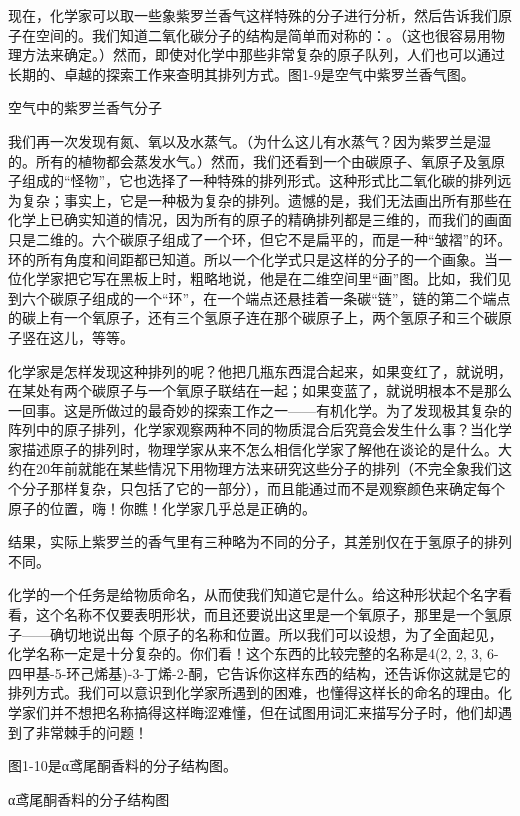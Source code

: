\documentclass[11pt,oneside]{book}
\begin{document}
\begin{common-format}
现在，化学家可以取一些象紫罗兰香气这样特殊的分子进行分析，然后告诉我们原子在空间的。我们知道二氧化碳分子的结构是简单而对称的：。（这也很容易用物理方法来确定。）然而，即使对化学中那些非常复杂的原子队列，人们也可以通过长期的、卓越的探索工作来查明其排列方式。图1-9是空气中紫罗兰香气图。
\begin{fig}{空气中的紫罗兰香气分子}
\label{fig:空气中的紫罗兰香气分子}
\end{fig}
我们再一次发现有氮、氧以及水蒸气。（为什么这儿有水蒸气？因为紫罗兰是湿的。所有的植物都会蒸发水气。）然而，我们还看到一个由碳原子、氧原子及氢原子组成的“怪物”，它也选择了一种特殊的排列形式。这种形式比二氧化碳的排列远为复杂；事实上，它是一种极为复杂的排列。遗憾的是，我们无法画出所有那些在化学上已确实知道的情况，因为所有的原子的精确排列都是三维的，而我们的画面只是二维的。六个碳原子组成了一个环，但它不是扁平的，而是一种“皱褶”的环。环的所有角度和间距都已知道。所以一个化学式只是这样的分子的一个画象。当一位化学家把它写在黑板上时，粗略地说，他是在二维空间里“画”图。比如，我们见到六个碳原子组成的一个“环”，在一个端点还悬挂着一条碳“链”，链的第二个端点的碳上有一个氧原子，还有三个氢原子连在那个碳原子上，两个氢原子和三个碳原子竖在这儿，等等。

化学家是怎样发现这种排列的呢？他把几瓶东西混合起来，如果变红了，就说明，在某处有两个碳原子与一个氧原子联结在一起；如果变蓝了，就说明根本不是那么一回事。这是所做过的最奇妙的探索工作之一——有机化学。为了发现极其复杂的阵列中的原子排列，化学家观察两种不同的物质混合后究竟会发生什么事？当化学家描述原子的排列时，物理学家从来不怎么相信化学家了解他在谈论的是什么。大约在20年前就能在某些情况下用物理方法来研究这些分子的排列（不完全象我们这个分子那样复杂，只包括了它的一部分），而且能通过而不是观察颜色来确定每个原子的位置，嗨！你瞧！化学家几乎总是正确的。

结果，实际上紫罗兰的香气里有三种略为不同的分子，其差别仅在于氢原子的排列不同。

化学的一个任务是给物质命名，从而使我们知道它是什么。给这种形状起个名字看看，这个名称不仅要表明形状，而且还要说出这里是一个氧原子，那里是一个氢原子——确切地说出每 个原子的名称和位置。所以我们可以设想，为了全面起见，化学名称一定是十分复杂的。你们看！这个东西的比较完整的名称是4(2, 2, 3, 6-四甲基-5-环己烯基)-3-丁烯-2-酮，它告诉你这样东西的结构，还告诉你这就是它的排列方式。我们可以意识到化学家所遇到的困难，也懂得这样长的命名的理由。化学家们并不想把名称搞得这样晦涩难懂，但在试图用词汇来描写分子时，他们却遇到了非常棘手的问题！

图1-10是α鸢尾酮香料的分子结构图。
\begin{fig}{α鸢尾酮香料的分子结构图}
\label{fig:α鸢尾酮香料的分子结构图}
\end{fig}


\end{common-format}
\end{document}
